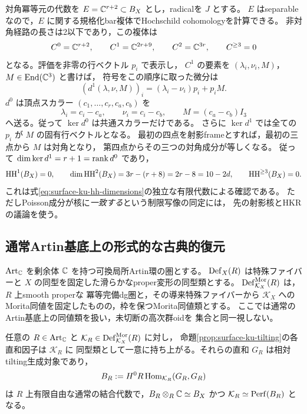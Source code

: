 \begin{remark}[有限代数からの独立なHochschild計算]
\label{rem:surface-ku-relative-bar}
対角冪等元の代数を $E=\mathbb C^{r+2}\subset B_X$ とし，radicalを $J$ とする。
$E$ はseparableなので，$E$ に関する規格化bar複体でHochschild cohomologyを計算できる。
非対角経路の長さは2以下であり，この複体は
\[
 C^0=\mathbb C^{r+2},\qquad C^1=\mathbb C^{2r+9},\qquad
 C^2=\mathbb C^{3r},\qquad C^{\ge3}=0
\]
となる。評価を非零の行ベクトル $p_i$ で表示し，
$C^1$ の要素を $(\lambda_i,\nu_i,M)$，$M\in\operatorname{End}(\mathbb C^3)$ と書けば，
符号をこの順序に取った微分は
\[
 (d^1(\lambda,\nu,M))_i=(\lambda_i-\nu_i)p_i+p_iM.
\]
$d^0$ は頂点スカラー $(c_1,\ldots,c_r,c_a,c_b)$ を
\[
 \lambda_i=c_i-c_a,\qquad \nu_i=c_i-c_b,\qquad
 M=(c_a-c_b)I_3
\]
へ送る。従って $\ker d^0$ は共通スカラーだけである。
さらに $\ker d^1$ では全ての $p_i$ が $M$ の固有行ベクトルとなる。
最初の四点を射影frameとすれば，最初の三点から $M$ は対角となり，
第四点からその三つの対角成分が等しくなる。
従って $\dim\ker d^1=r+1=\operatorname{rank} d^0$ であり，
\[
 \operatorname{HH}^1(B_X)=0,\qquad
 \dim\operatorname{HH}^2(B_X)=3r-(r+8)=2r-8=10-2d,
 \qquad \operatorname{HH}^{\ge3}(B_X)=0.
\]
これは式\eqref{eq:surface-ku-hh-dimensions}の独立な有限代数による確認である。
ただしPoisson成分が核に\emph{一致する}という制限写像の同定には，
先の射影核とHKRの議論を使う。
\end{remark}

\subsection{通常Artin基底上の形式的な古典的復元}

$\operatorname{Art}_{\mathbb C}$ を剰余体 $\mathbb C$ を持つ可換局所Artin環の圏とする。
$\operatorname{Def}_X(R)$ は特殊ファイバーと $X$ の同型を固定した滑らかなproper変形の同型類とする。
$\operatorname{Def}^{\mathrm{Mor}}_{\mathcal K_X}(R)$ は，$R$ 上smooth properな
冪等完備dg圏と，その導来特殊ファイバーから $\mathcal K_X$ への
Morita同値を固定したものの，枠を保つMorita同値類とする。
ここでは通常のArtin基底上の同値類を扱い，未切断の高次群oidを
集合と同一視しない。

\begin{lemma}[tilting対象の持上げによる通常代数への還元]
\label{lem:surface-ku-artin-tilting}
任意の $R\in\operatorname{Art}_{\mathbb C}$ と
$\mathcal K_R\in\operatorname{Def}^{\mathrm{Mor}}_{\mathcal K_X}(R)$ に対し，
命題\ref{prop:surface-ku-tilting}の各直和因子は $\mathcal K_R$ に
同型類として一意に持ち上がる。それらの直和 $G_R$ は相対tilting生成対象であり，
\[
 B_R:=H^0R\operatorname{Hom}_{\mathcal K_R}(G_R,G_R)
\]
は $R$ 上有限自由な通常の結合代数で，$B_R\otimes_R\mathbb C\simeq B_X$ かつ
$\mathcal K_R\simeq\operatorname{Perf}(B_R)$ となる。
\end{lemma}


